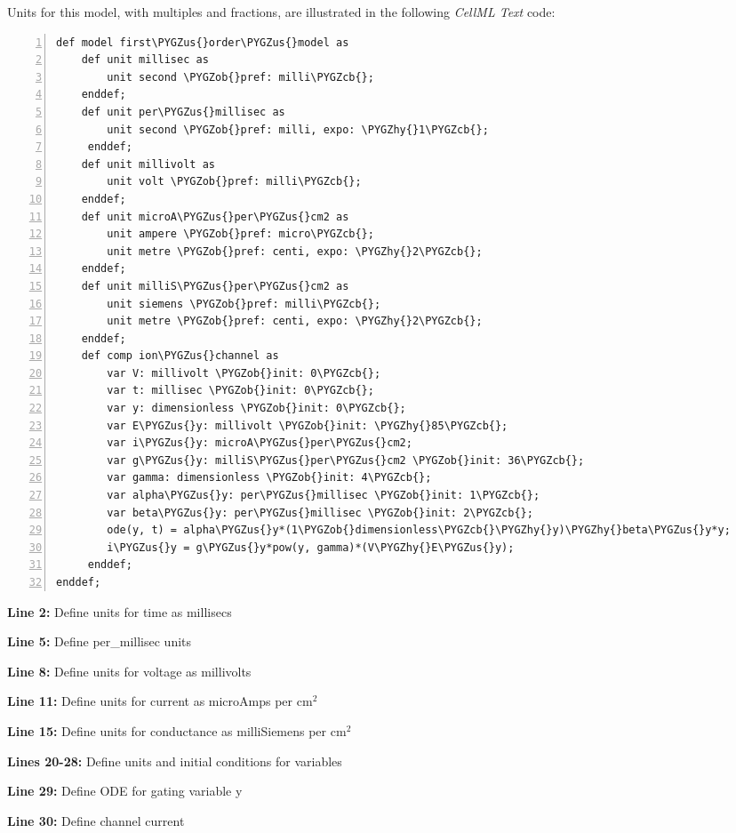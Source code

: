 \documentclass[a4paper,10pt,english]{sphinxmanual}
\def\PYGZus{\char`\_}
\def\PYGZob{\char`\{}
\def\PYGZcb{\char`\}}
\def\PYGZhy{\char`\-}
\begin{document}
Units for this model, with multiples and fractions, are illustrated in
the following \emph{CellML Text} code:

\begin{Verbatim}[commandchars=\\\{\},numbers=left,firstnumber=1,stepnumber=1]
def model first\PYGZus{}order\PYGZus{}model as
    def unit millisec as
        unit second \PYGZob{}pref: milli\PYGZcb{};
    enddef;
    def unit per\PYGZus{}millisec as
        unit second \PYGZob{}pref: milli, expo: \PYGZhy{}1\PYGZcb{};
     enddef;
    def unit millivolt as
        unit volt \PYGZob{}pref: milli\PYGZcb{};
    enddef;
    def unit microA\PYGZus{}per\PYGZus{}cm2 as
        unit ampere \PYGZob{}pref: micro\PYGZcb{};
        unit metre \PYGZob{}pref: centi, expo: \PYGZhy{}2\PYGZcb{};
    enddef;
    def unit milliS\PYGZus{}per\PYGZus{}cm2 as
        unit siemens \PYGZob{}pref: milli\PYGZcb{};
        unit metre \PYGZob{}pref: centi, expo: \PYGZhy{}2\PYGZcb{};
    enddef;
    def comp ion\PYGZus{}channel as
        var V: millivolt \PYGZob{}init: 0\PYGZcb{};
        var t: millisec \PYGZob{}init: 0\PYGZcb{};
        var y: dimensionless \PYGZob{}init: 0\PYGZcb{};
        var E\PYGZus{}y: millivolt \PYGZob{}init: \PYGZhy{}85\PYGZcb{};
        var i\PYGZus{}y: microA\PYGZus{}per\PYGZus{}cm2;
        var g\PYGZus{}y: milliS\PYGZus{}per\PYGZus{}cm2 \PYGZob{}init: 36\PYGZcb{};
        var gamma: dimensionless \PYGZob{}init: 4\PYGZcb{};
        var alpha\PYGZus{}y: per\PYGZus{}millisec \PYGZob{}init: 1\PYGZcb{};
        var beta\PYGZus{}y: per\PYGZus{}millisec \PYGZob{}init: 2\PYGZcb{};
        ode(y, t) = alpha\PYGZus{}y*(1\PYGZob{}dimensionless\PYGZcb{}\PYGZhy{}y)\PYGZhy{}beta\PYGZus{}y*y;
        i\PYGZus{}y = g\PYGZus{}y*pow(y, gamma)*(V\PYGZhy{}E\PYGZus{}y);
     enddef;
enddef;
\end{Verbatim}

\begin{DUlineblock}{0em}
\item[] \textbf{Line 2:} Define units for time as millisecs
\item[] \textbf{Line 5:} Define per\_millisec units
\item[] \textbf{Line 8:} Define units for voltage as millivolts
\item[] \textbf{Line 11:} Define units for current as microAmps per cm$^{\text{2}}$
\item[] \textbf{Line 15:} Define units for conductance as milliSiemens per cm$^{\text{2}}$
\item[] \textbf{Lines 20-28:} Define units and initial conditions for variables
\item[] \textbf{Line 29:} Define ODE for gating variable y
\item[] \textbf{Line 30:} Define channel current
\end{DUlineblock}
\end{document}
